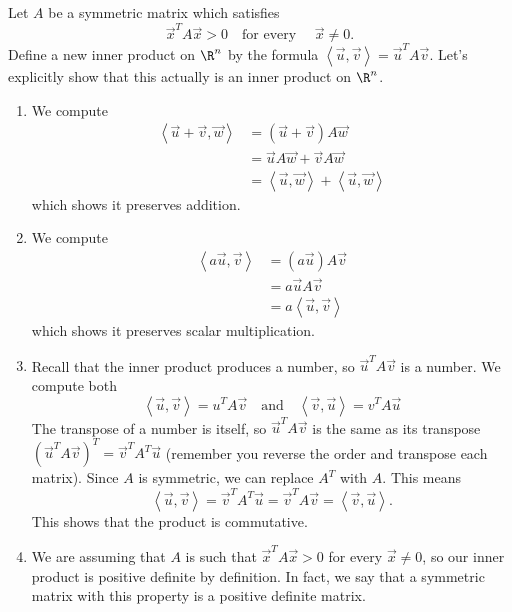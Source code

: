 \begin{example}
Let $A$ be a symmetric matrix which satisfies $$\vec x^T A\vec x> 0\quad \text{for every }\quad \vec x\neq 0.$$ 
Define a new inner product on $\R^n$ by the formula $\left<\vec u,\vec v\right> = \vec u^T A \vec v$. 
Let's explicitly show that this actually is an inner product on $\R^n$.
\begin{enumerate}
\item We compute \begin{align*} 
	\left<\vec u +\vec v,\vec w\right> 
	& =(\vec u+\vec v) A \vec w \\
	&=\vec uA\vec w+\vec vA \vec w  \\
	&= \left<\vec u,\vec w\right> +\left<\vec u,\vec w\right> 
	\end{align*}
	which shows it preserves addition.

	\item We compute \begin{align*} 
	\left<a\vec u ,\vec v\right> 
	& =(a\vec u) A \vec v \\
	&=a\vec uA\vec v \\
	&= a\left<\vec u,\vec v\right> 
	\end{align*}
	which shows it preserves scalar multiplication.
	\item Recall that the inner product produces a number, so $\vec u^T A \vec v$ is a number.  
	We compute both 
	$$\left<\vec u ,\vec v\right> = u^TA\vec v 
	\quad\text{and}\quad 
	\left<\vec v ,\vec u\right> = v^TA\vec u
	$$ 
	The transpose of a number is itself, so $\vec u^T A \vec v$ is the same as its transpose $(\vec u^T A \vec v)^T = \vec v^T A^T\vec u$ (remember you reverse the order and transpose each matrix).  
	Since $A$ is symmetric, we can replace $A^T$ with $A$. This means  
	$$\left<\vec u, \vec v \right> = \vec v^T A^T\vec u= \vec v^T A\vec v = \left<\vec v,\vec u\right>.$$ This shows that the product is commutative.
	\item We are assuming that $A$ is such that $\vec x^T A\vec x> 0$ for every $\vec x\neq 0$, so our inner product is positive definite by definition.  In fact, we say that a symmetric matrix with this property is a positive definite matrix.
\end{enumerate}
\end{example}

